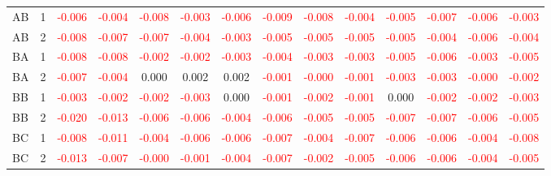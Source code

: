 \begin{table}[!htb]
{\begin{tabular}{llcccccccccccc}
AB & 1 & \textcolor{red}{-0.006} & \textcolor{red}{-0.004} & \textcolor{red}{-0.008} & \textcolor{red}{-0.003} & \textcolor{red}{-0.006} & \textcolor{red}{-0.009} & \textcolor{red}{-0.008} & \textcolor{red}{-0.004} & \textcolor{red}{-0.005} & \textcolor{red}{-0.007} & \textcolor{red}{-0.006} & \textcolor{red}{-0.003}\\
AB & 2 & \textcolor{red}{-0.008} & \textcolor{red}{-0.007} & \textcolor{red}{-0.007} & \textcolor{red}{-0.004} & \textcolor{red}{-0.003} & \textcolor{red}{-0.005} & \textcolor{red}{-0.005} & \textcolor{red}{-0.005} & \textcolor{red}{-0.005} & \textcolor{red}{-0.004} & \textcolor{red}{-0.006} & \textcolor{red}{-0.004}\\
BA & 1 & \textcolor{red}{-0.008} & \textcolor{red}{-0.008} & \textcolor{red}{-0.002} & \textcolor{red}{-0.002} & \textcolor{red}{-0.003} & \textcolor{red}{-0.004} & \textcolor{red}{-0.003} & \textcolor{red}{-0.003} & \textcolor{red}{-0.005} & \textcolor{red}{-0.006} & \textcolor{red}{-0.003} & \textcolor{red}{-0.005}\\
BA & 2 & \textcolor{red}{-0.007} & \textcolor{red}{-0.004} & 0.000 & 0.002 & 0.002 & \textcolor{red}{-0.001} & \textcolor{red}{-0.000} & \textcolor{red}{-0.001} & \textcolor{red}{-0.003} & \textcolor{red}{-0.003} & \textcolor{red}{-0.000} & \textcolor{red}{-0.002}\\
BB & 1 & \textcolor{red}{-0.003} & \textcolor{red}{-0.002} & \textcolor{red}{-0.002} & \textcolor{red}{-0.003} & 0.000 & \textcolor{red}{-0.001} & \textcolor{red}{-0.002} & \textcolor{red}{-0.001} & 0.000 & \textcolor{red}{-0.002} & \textcolor{red}{-0.002} & \textcolor{red}{-0.003}\\
BB & 2 & \textcolor{red}{-0.020} & \textcolor{red}{-0.013} & \textcolor{red}{-0.006} & \textcolor{red}{-0.006} & \textcolor{red}{-0.004} & \textcolor{red}{-0.006} & \textcolor{red}{-0.005} & \textcolor{red}{-0.005} & \textcolor{red}{-0.007} & \textcolor{red}{-0.007} & \textcolor{red}{-0.006} & \textcolor{red}{-0.005}\\
BC & 1 & \textcolor{red}{-0.008} & \textcolor{red}{-0.011} & \textcolor{red}{-0.004} & \textcolor{red}{-0.006} & \textcolor{red}{-0.006} & \textcolor{red}{-0.007} & \textcolor{red}{-0.004} & \textcolor{red}{-0.007} & \textcolor{red}{-0.006} & \textcolor{red}{-0.006} & \textcolor{red}{-0.004} & \textcolor{red}{-0.008}\\
BC & 2 & \textcolor{red}{-0.013} & \textcolor{red}{-0.007} & \textcolor{red}{-0.000} & \textcolor{red}{-0.001} & \textcolor{red}{-0.004} & \textcolor{red}{-0.007} & \textcolor{red}{-0.002} & \textcolor{red}{-0.005} & \textcolor{red}{-0.006} & \textcolor{red}{-0.006} & \textcolor{red}{-0.004} & \textcolor{red}{-0.005}\\

\end{tabular}}
\end{table}
